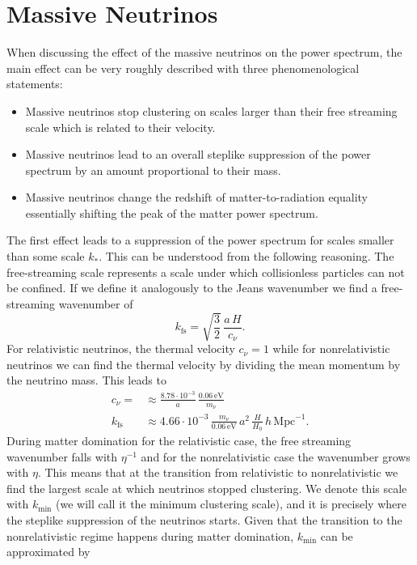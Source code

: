 \documentclass[../main.tex]{subfiles}
\begin{document}
\section{Massive Neutrinos}  
When discussing the effect of the massive neutrinos on the power spectrum, the main effect can be very roughly described with three phenomenological statements:\begin{itemize}
    \item Massive neutrinos stop clustering on scales larger than their free streaming scale which is related to their velocity.
    \item Massive neutrinos lead to an overall steplike suppression of the power spectrum by an amount proportional to their mass.
    \item Massive neutrinos change the redshift of matter-to-radiation equality essentially shifting the peak of the matter power spectrum.
\end{itemize}
The first effect leads to a suppression of the power spectrum for scales smaller than some scale $k_*$. This can be understood from the following reasoning. The free-streaming scale represents a scale under which collisionless particles can not be confined. If we define it analogously to the Jeans wavenumber we find a free-streaming wavenumber of 
\begin{equation}
    k_\mathrm{fs} = \sqrt{\frac{3}{2}}\,\frac{a\,H}{c_\nu}.
\end{equation}
For relativistic neutrinos, the thermal velocity $c_\nu=1$ while for nonrelativistic neutrinos we can find the thermal velocity by dividing the mean momentum by the neutrino mass. This leads to \begin{align}
    c_\nu =  &\approx \frac{8.78\cdot10^{-3}}{a}\,\frac{0.06\,\mathrm{eV}}{m_\nu} \nonumber \\
    k_\mathrm{fs} &\approx 4.66\cdot10^{-3}\,\frac{m_\nu}{0.06\,\mathrm{eV}}\,a^2\,\frac{H}{H_0}\,h\,\mathrm{Mpc}^{-1}.
\end{align}
During matter domination for the relativistic case, the free streaming wavenumber falls with $\eta^{-1}$ and for the nonrelativistic case the wavenumber grows with $\eta$. This means that at the transition from relativistic to nonrelativistic we find the largest scale at which neutrinos stopped clustering. We denote this scale with $k_\mathrm{min}$ (we will call it the minimum clustering scale), and it is precisely where the steplike suppression of the neutrinos starts. Given that the transition to the nonrelativistic regime happens during matter domination, $k_\mathrm{min}$ can be approximated by 
\end{document}
